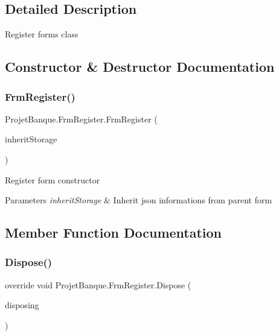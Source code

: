 \subsection{Detailed Description}
Register form\textquotesingle{}s class 



\subsection{Constructor \& Destructor Documentation}
\mbox{\label{class_projet_banque_1_1_frm_register_a292dc36061f06527217b4dc3a14a868e}} 
\subsubsection{\texorpdfstring{FrmRegister()}{FrmRegister()}}
{\footnotesize\ttfamily Projet\+Banque.\+Frm\+Register.\+Frm\+Register (\begin{DoxyParamCaption}\item[{\mbox{\hyperlink{class_projet_banque_1_1_json_data}{Json\+Data}}}]{inherit\+Storage }\end{DoxyParamCaption})}



Register form constructor 


\begin{DoxyParams}{Parameters}
{\em inherit\+Storage} & Inherit json informations from parent form\\
\hline
\end{DoxyParams}


\subsection{Member Function Documentation}
\mbox{\label{class_projet_banque_1_1_frm_register_a5f53078c455923563c63a457f63895a9}} 
\subsubsection{\texorpdfstring{Dispose()}{Dispose()}}
{\footnotesize\ttfamily override void Projet\+Banque.\+Frm\+Register.\+Dispose (\begin{DoxyParamCaption}\item[{bool}]{disposing }\end{DoxyParamCaption})\hspace{0.3cm}{\ttfamily [protected]}}



